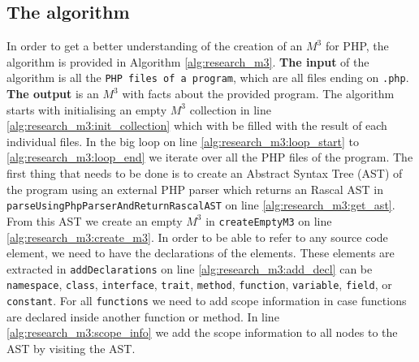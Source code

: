 \documentclass[../main.tex]{subfiles}
\begin{document}
    
    \subsection{The algorithm}
    In order to get a better understanding of the creation of an $M^3$ for PHP, the algorithm is provided in Algorithm \ref{alg:research_m3}.
    \textbf{The input} of the algorithm is all the \texttt{PHP files of a program}, which are all files ending on \texttt{.php}.
    \textbf{The output} is an $M^3$ with facts about the provided program.
    The algorithm starts with initialising an empty $M^3$ collection in line \ref{alg:research_m3:init_collection} which with be filled with the result of each individual files.
    In the big loop on line \ref{alg:research_m3:loop_start} to \ref{alg:research_m3:loop_end} we iterate over all the PHP files of the program.
    The first thing that needs to be done is to create an Abstract Syntax Tree (\gls{AST}) of the program using an external PHP parser\footnotemark{} which returns an Rascal AST in \texttt{parseUsingPhpParserAndReturnRascalAST} on line \ref{alg:research_m3:get_ast}.
    From this AST we create an empty $M^3$ in \texttt{createEmptyM3} on line \ref{alg:research_m3:create_m3}.
    In order to be able to refer to any source code element, we need to have the declarations of the elements.
    These elements are extracted in \texttt{addDeclarations} on line \ref{alg:research_m3:add_decl} can be \texttt{namespace}, \texttt{class}, \texttt{interface}, \texttt{trait}, \texttt{method},  \texttt{function}, \texttt{variable}, \texttt{field}, or \texttt{constant}.
    For all \texttt{functions} we need to add scope information in case functions are declared inside another function or method.
    In line \ref{alg:research_m3:scope_info} we add the scope information to all nodes to the AST by visiting the AST.
\end{document}
